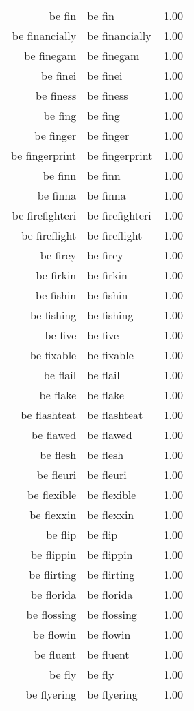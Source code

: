 \begin{table}[ht]
\begin{tabular}{rlr}
  be fin & be fin & 1.00 \\ 
  be financially & be financially & 1.00 \\ 
  be finegam & be finegam & 1.00 \\ 
  be finei & be finei & 1.00 \\ 
  be finess & be finess & 1.00 \\ 
  be fing & be fing & 1.00 \\ 
  be finger & be finger & 1.00 \\ 
  be fingerprint & be fingerprint & 1.00 \\ 
  be finn & be finn & 1.00 \\ 
  be finna & be finna & 1.00 \\ 
  be firefighteri & be firefighteri & 1.00 \\ 
  be fireflight & be fireflight & 1.00 \\ 
  be firey & be firey & 1.00 \\ 
  be firkin & be firkin & 1.00 \\ 
  be fishin & be fishin & 1.00 \\ 
  be fishing & be fishing & 1.00 \\ 
  be five & be five & 1.00 \\ 
  be fixable & be fixable & 1.00 \\ 
  be flail & be flail & 1.00 \\ 
  be flake & be flake & 1.00 \\ 
  be flashteat & be flashteat & 1.00 \\ 
  be flawed & be flawed & 1.00 \\ 
  be flesh & be flesh & 1.00 \\ 
  be fleuri & be fleuri & 1.00 \\ 
  be flexible & be flexible & 1.00 \\ 
  be flexxin & be flexxin & 1.00 \\ 
  be flip & be flip & 1.00 \\ 
  be flippin & be flippin & 1.00 \\ 
  be flirting & be flirting & 1.00 \\ 
  be florida & be florida & 1.00 \\ 
  be flossing & be flossing & 1.00 \\ 
  be flowin & be flowin & 1.00 \\ 
  be fluent & be fluent & 1.00 \\ 
  be fly & be fly & 1.00 \\ 
  be flyering & be flyering & 1.00 \\ 

\end{tabular}
\end{table}

